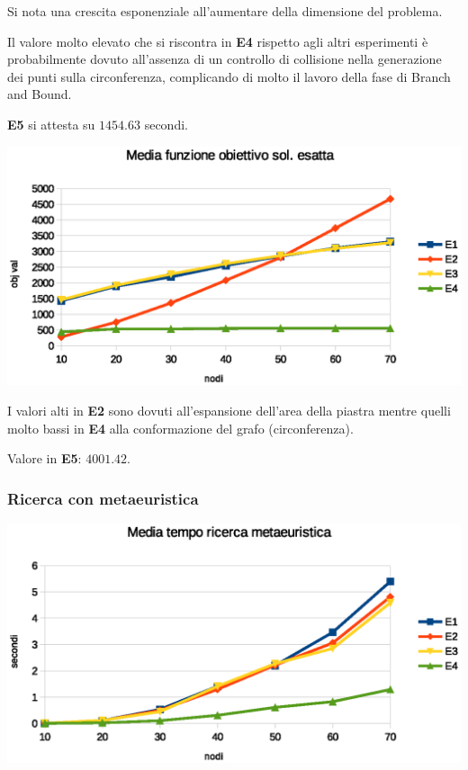 \documentclass[a4paper]{article}
\begin{document}
                Si nota una crescita esponenziale all'aumentare della dimensione del problema.

                Il valore molto elevato che si riscontra in \textbf{E4} rispetto agli altri esperimenti \`e probabilmente dovuto all'assenza di un controllo di collisione
                nella generazione dei punti sulla circonferenza, complicando di molto il lavoro della fase di Branch and Bound.

                \textbf{E5} si attesta su $1454.63$ secondi.

                \includegraphics[scale=0.7]{img/exavgobj}

                I valori alti in \textbf{E2} sono dovuti all'espansione dell'area della piastra mentre quelli molto bassi in \textbf{E4} alla
                conformazione del grafo (circonferenza).

                Valore in \textbf{E5}: $4001.42$.

            \subsubsection{Ricerca con metaeuristica}

                    \includegraphics[scale=0.7]{img/gavgtime}
\end{document}
